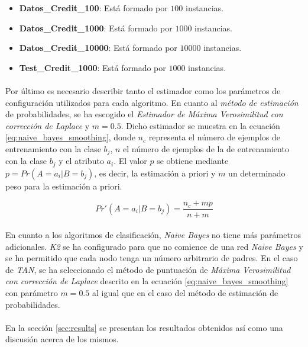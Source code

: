 \documentclass{article}
\begin{document}
			\begin{itemize}
				\item \textbf{Datos\_Credit\_100}: Está formado por $100$ instancias.
				\item \textbf{Datos\_Credit\_1000}: Está formado por $1000$ instancias.
				\item \textbf{Datos\_Credit\_10000}: Está formado por $10000$ instancias.
				\item \textbf{Test\_Credit\_1000}: Está formado por $1000$ instancias.
			\end{itemize}

			\paragraph{}
			Por último es necesario describir tanto el estimador como los parámetros de configuración utilizados para cada algoritmo. En cuanto al \emph{método de estimación} de probabilidades, se ha escogido el \emph{Estimador de Máxima Verosimilitud con corrección de Laplace} y $m = 0.5$. Dicho estimador se muestra en la ecuación \eqref{eq:naive_bayes_smoothing}, donde $n_c$ representa el número de ejemplos de entrenamiento con la clase $b_j$, $n$ el número de ejemplos de la de entrenamiento con la clase $b_j$ y el atributo $a_i$. El valor $p$ se obtiene mediante $p = Pr(A = a_i | B = b_j)$, es decir, la estimación a priori y $m$ un determinado peso para la estimación a priori.

			\begin{equation}
			\label{eq:naive_bayes_smoothing}
			 Pr'(A = a_i | B = b_j) = \frac{n_c + mp}{n + m}
			\end{equation}

			\paragraph{}
			En cuanto a los algoritmos de clasificación, \emph{Naive Bayes} no tiene más parámetros adicionales. \emph{K2} se ha configurado para que no comience de una red \emph{Naive Bayes} y se ha permitido que cada nodo tenga un número arbitrario de padres. En el caso de \emph{TAN}, se ha seleccionado el método de puntuación de \emph{Máxima Verosimilitud con corrección de Laplace} descrito en la ecuación \eqref{eq:naive_bayes_smoothing} con parámetro $m = 0.5$ al igual que en el caso del método de estimación de probabilidades.

		\paragraph{}
		En la sección \ref{sec:results} se presentan los resultados obtenidos así como una discusión acerca de los mismos.
\end{document}
